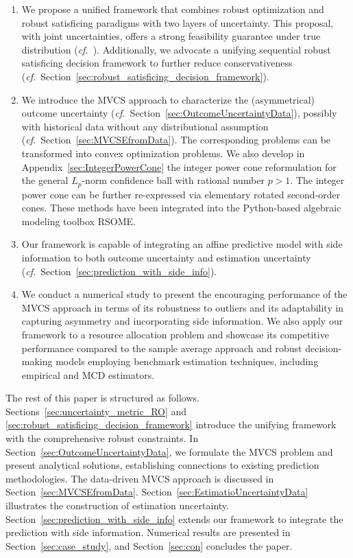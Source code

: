 \documentclass[mnsc, nonblindrev]{informswp}
\newcommand{\1}[1]{\mathds{1}{\left(#1\right)}}
\begin{document}
\begin{enumerate}
\item We propose a unified framework that combines robust optimization and robust satisficing paradigms with two layers of uncertainty. This proposal, with joint uncertainties, offers a strong feasibility guarantee under true distribution (\textit{cf.}~). Additionally, we advocate a unifying sequential robust satisficing decision framework to further reduce conservativeness (\textit{cf.}~Section~\ref{sec:robust_satisficing_decision_framework}).

\item We introduce the MVCS approach to characterize the (asymmetrical) outcome uncertainty (\textit{cf.}~Section~\ref{sec:OutcomeUncertaintyData}),  possibly with historical data without any distributional assumption (\textit{cf.}~Section~\ref{sec:MVCSEfromData}). The corresponding problems can be transformed into convex optimization problems. We also develop in Appendix~\ref{sec:IntegerPowerCone} the integer power cone reformulation for the general $L_p$-norm confidence ball with rational number $p>1$. The integer power cone can be further re-expressed via elementary rotated second-order cones. These methods have been integrated into the Python-based algebraic modeling toolbox RSOME.

\item Our framework is capable of integrating an affine predictive model with side information to both outcome uncertainty and estimation uncertainty (\textit{cf.}~Section~\ref{sec:prediction_with_side_info}).

\item We conduct a numerical study to present the encouraging performance of the MVCS approach in terms of its robustness to outliers and its adaptability in capturing asymmetry and incorporating side information. We also apply our framework to a resource allocation problem and showcase its competitive performance compared to the sample average approach and robust decision-making models employing benchmark estimation techniques, including empirical and MCD estimators.
\end{enumerate}


The rest of this paper is structured as follows. Sections~\ref{sec:uncertainty_metric_RO} and \ref{sec:robust_satisficing_decision_framework} introduce the unifying framework with the comprehensive robust constraints. In Section~\ref{sec:OutcomeUncertaintyData}, we formulate the MVCS problem and present analytical solutions, establishing connections to existing prediction methodologies. The data-driven MVCS approach is discussed in Section~\ref{sec:MVCSEfromData}. Section~\ref{sec:EstimatioUncertaintyData} illustrates the construction of estimation uncertainty. Section~\ref{sec:prediction_with_side_info} extends our framework to integrate the prediction with side information. Numerical results are presented in Section~\ref{sec:case_study}, and Section~\ref{sec:con} concludes the paper.
\medskip
\end{document}
